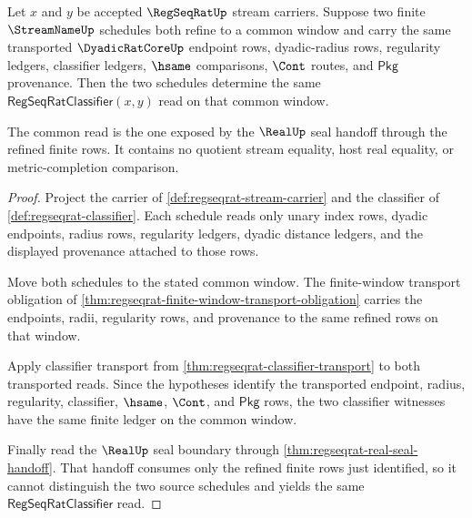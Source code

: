 \begin{theorem}
\label{thm:regseqrat-common-refinement-classifier-determinacy}
Let $x$ and $y$ be accepted $\RegSeqRatUp$ stream carriers. Suppose two finite $\StreamNameUp$ schedules both refine to a common window and carry the same transported $\DyadicRatCoreUp$ endpoint rows, dyadic-radius rows, regularity ledgers, classifier ledgers, $\hsame$ comparisons, $\Cont$ routes, and $\mathsf{Pkg}$ provenance. Then the two schedules determine the same $\mathsf{RegSeqRatClassifier}(x,y)$ read on that common window.

The common read is the one exposed by the $\RealUp$ seal handoff through the refined finite rows. It contains no quotient stream equality, host real equality, or metric-completion comparison.
\end{theorem}
\begin{proof}
Project the carrier of \autoref{def:regseqrat-stream-carrier} and the classifier of \autoref{def:regseqrat-classifier}. Each schedule reads only unary index rows, dyadic endpoints, radius rows, regularity ledgers, dyadic distance ledgers, and the displayed provenance attached to those rows.

Move both schedules to the stated common window. The finite-window transport obligation of \autoref{thm:regseqrat-finite-window-transport-obligation} carries the endpoints, radii, regularity rows, and provenance to the same refined rows on that window.

Apply classifier transport from \autoref{thm:regseqrat-classifier-transport} to both transported reads. Since the hypotheses identify the transported endpoint, radius, regularity, classifier, $\hsame$, $\Cont$, and $\mathsf{Pkg}$ rows, the two classifier witnesses have the same finite ledger on the common window.

Finally read the $\RealUp$ seal boundary through \autoref{thm:regseqrat-real-seal-handoff}. That handoff consumes only the refined finite rows just identified, so it cannot distinguish the two source schedules and yields the same $\mathsf{RegSeqRatClassifier}$ read.
\end{proof}

